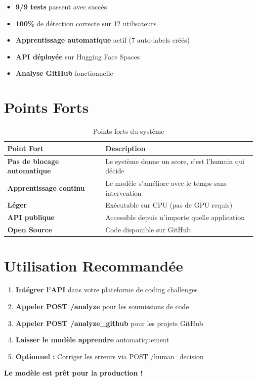 \documentclass[12pt,a4paper]{report}
\begin{document}
\begin{successbox}
\begin{itemize}
    \item \textbf{9/9 tests} passent avec succès
    \item \textbf{100\%} de détection correcte sur 12 utilisateurs
    \item \textbf{Apprentissage automatique} actif (7 auto-labels créés)
    \item \textbf{API déployée} sur Hugging Face Spaces
    \item \textbf{Analyse GitHub} fonctionnelle
\end{itemize}
\end{successbox}

\section{Points Forts}

\begin{table}[H]
\centering
\renewcommand{\arraystretch}{1.5}
\begin{tabular}{>{\bfseries}l p{8cm}}
\toprule
\textbf{Point Fort} & \textbf{Description} \\
\midrule
Pas de blocage automatique & Le système donne un score, c'est l'humain qui décide \\
Apprentissage continu & Le modèle s'améliore avec le temps sans intervention \\
Léger & Exécutable sur CPU (pas de GPU requis) \\
API publique & Accessible depuis n'importe quelle application \\
Open Source & Code disponible sur GitHub \\
\bottomrule
\end{tabular}
\caption{Points forts du système}
\end{table}

\section{Utilisation Recommandée}

\begin{enumerate}
    \item \textbf{Intégrer l'API} dans votre plateforme de coding challenges
    \item \textbf{Appeler POST /analyze} pour les soumissions de code
    \item \textbf{Appeler POST /analyze\_github} pour les projets GitHub
    \item \textbf{Laisser le modèle apprendre} automatiquement
    \item \textbf{Optionnel :} Corriger les erreurs via POST /human\_decision
\end{enumerate}

\vspace{1cm}

\begin{center}
\Large\bfseries\color{primaryblue}
Le modèle est prêt pour la production !
\end{center}

\end{document}

